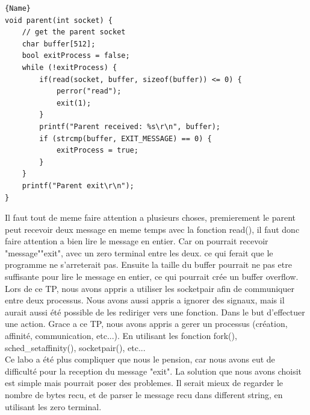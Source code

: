 \documentclass[
	a4paper, %
	10pt, %
]{CSUniSchoolLabReport}
\begin{document}
\begin{minipage}{.45\textwidth}
\begin{lstlisting}[style=CStyle, caption=Processus Parent]{Name}
void parent(int socket) {
	// get the parent socket
	char buffer[512];
	bool exitProcess = false;
	while (!exitProcess) {
		if(read(socket, buffer, sizeof(buffer)) <= 0) {
			perror("read");
			exit(1);
		}
		printf("Parent received: %s\r\n", buffer);
		if (strcmp(buffer, EXIT_MESSAGE) == 0) {
			exitProcess = true;
		}
	}
	printf("Parent exit\r\n");
}
\end{lstlisting}
\end{minipage}
Il faut tout de meme faire attention a plusieurs choses, premierement le parent peut recevoir deux message en meme temps avec la fonction read(), il faut donc faire attention a bien lire le message en entier.
Car on pourrait recevoir "message""exit", avec un zero terminal entre les deux. ce qui ferait que le programme ne s'arreterait pas.
Ensuite la taille du buffer pourrait ne pas etre suffisante pour lire le message en entier, ce qui pourrait crée un buffer overflow.\\

Lors de ce TP, nous avons appris a utiliser les socketpair afin de communiquer entre deux processus.
Nous avons aussi appris a ignorer des signaux, mais il aurait aussi été possible de les rediriger vers une fonction. Dans le but d'effectuer une action.
Grace a ce TP, nous avons appris a gerer un processus (création, affinité, communication, etc...). En utilisant les fonction fork(), sched\_setaffinity(), socketpair(), etc...\\

Ce labo a été plus compliquer que nous le pension, car nous avons eut de difficulté pour la reception du message "exit". La solution que nous avons choisit est simple mais pourrait poser des problemes.
Il serait mieux de regarder le nombre de bytes recu, et de parser le message recu dans different string, en utilisant les zero terminal.
\end{document}
